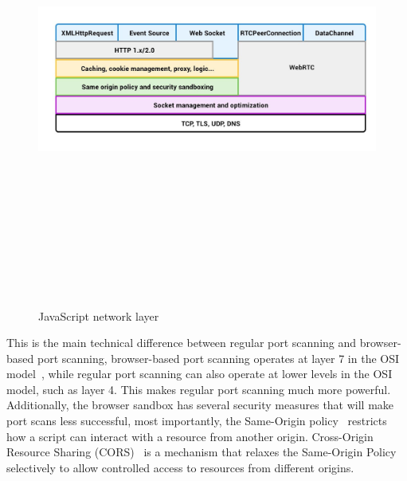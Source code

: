 \begin{figure}[h]
    \centering
    \includegraphics[width=15cm, height=15cm, keepaspectratio]{background/img/js_network_stack.jpg}
    \caption{JavaScript network layer}
    \label{fig:js-network-stack}
\end{figure}

This is the main technical difference between regular port scanning and browser-based port scanning, browser-based port scanning operates at layer 7 in the OSI model~, while regular port scanning can also operate at lower levels in the OSI model, such as layer 4. 
This makes regular port scanning much more powerful.
Additionally, the browser sandbox has several security measures that will make port scans less successful, most importantly, the Same-Origin policy~ restricts how a script can interact with a resource from another origin. 
Cross-Origin Resource Sharing (CORS)~ is a mechanism that relaxes the Same-Origin Policy selectively to allow controlled access to resources from different origins. 

